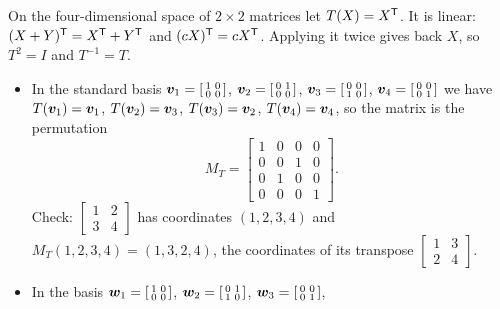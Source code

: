 \begin{example}\label{ex:u34-transpose}
On the four-dimensional space of $2\times2$ matrices let $T(X)=X^{\mathsf{T}}$. It is linear:
$(X+Y)^{\mathsf{T}}=X^{\mathsf{T}}+Y^{\mathsf{T}}$ and $(cX)^{\mathsf{T}}=cX^{\mathsf{T}}$. Applying it twice gives back $X$, so $T^2=I$ and $T^{-1}=T$.
\begin{itemize}
  \item In the standard basis $\boldsymbol{v}_1=\left[\begin{smallmatrix}1&0\\0&0\end{smallmatrix}\right]$,
        $\boldsymbol{v}_2=\left[\begin{smallmatrix}0&1\\0&0\end{smallmatrix}\right]$,
        $\boldsymbol{v}_3=\left[\begin{smallmatrix}0&0\\1&0\end{smallmatrix}\right]$,
        $\boldsymbol{v}_4=\left[\begin{smallmatrix}0&0\\0&1\end{smallmatrix}\right]$ we have
        $T(\boldsymbol{v}_1)=\boldsymbol{v}_1$, $T(\boldsymbol{v}_2)=\boldsymbol{v}_3$, $T(\boldsymbol{v}_3)=\boldsymbol{v}_2$, $T(\boldsymbol{v}_4)=\boldsymbol{v}_4$, so the matrix is the
        permutation
        \[
          M_T=\begin{bmatrix}1&0&0&0\\0&0&1&0\\0&1&0&0\\0&0&0&1\end{bmatrix}.
        \]
        Check: $\left[\begin{smallmatrix}1&2\\3&4\end{smallmatrix}\right]$ has coordinates $(1,2,3,4)$ and
        $M_T(1,2,3,4)=(1,3,2,4)$, the coordinates of its transpose
        $\left[\begin{smallmatrix}1&3\\2&4\end{smallmatrix}\right]$.
  \item In the basis $\boldsymbol{w}_1=\left[\begin{smallmatrix}1&0\\0&0\end{smallmatrix}\right]$,
        $\boldsymbol{w}_2=\left[\begin{smallmatrix}0&1\\1&0\end{smallmatrix}\right]$,
        $\boldsymbol{w}_3=\left[\begin{smallmatrix}0&0\\0&1\end{smallmatrix}\right]$,

\end{itemize}
\end{example}
